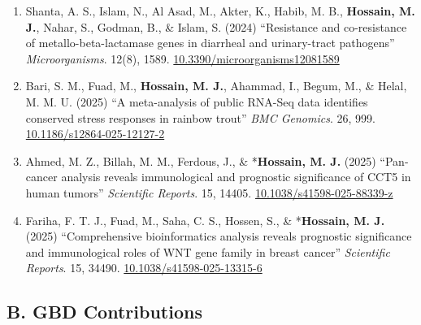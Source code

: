 \documentclass[
  11pt,
  letterpaper,
  DIV=11,
  numbers=noendperiod]{scrartcl}
\begin{document}
\begin{enumerate}
  e70356.
  \href{https://doi.org/10.1002/hsr2.70356}{10.1002/hsr2.70356}\\
\item
  Shanta, A. S., Islam, N., Al Asad, M., Akter, K., Habib, M. B.,
  \textbf{Hossain, M. J.}, Nahar, S., Godman, B., \& Islam, S. (2024)
  ``Resistance and co-resistance of metallo-beta-lactamase genes in
  diarrheal and urinary-tract pathogens'' \emph{Microorganisms}. 12(8),
  1589.
  \href{https://doi.org/10.3390/microorganisms12081589}{10.3390/microorganisms12081589}\\
\item
  Bari, S. M., Fuad, M., \textbf{Hossain, M. J.}, Ahammad, I., Begum,
  M., \& Helal, M. M. U. (2025) ``A meta-analysis of public RNA-Seq data
  identifies conserved stress responses in rainbow trout'' \emph{BMC
  Genomics}. 26, 999.
  \href{https://doi.org/10.1186/s12864-025-12127-2}{10.1186/s12864-025-12127-2}\\
\item
  Ahmed, M. Z., Billah, M. M., Ferdous, J., \& *\textbf{Hossain, M. J.}
  (2025) ``Pan-cancer analysis reveals immunological and prognostic
  significance of CCT5 in human tumors'' \emph{Scientific Reports}. 15,
  14405.
  \href{https://doi.org/10.1038/s41598-025-88339-z}{10.1038/s41598-025-88339-z}\\
\item
  Fariha, F. T. J., Fuad, M., Saha, C. S., Hossen, S., \&
  *\textbf{Hossain, M. J.} (2025) ``Comprehensive bioinformatics
  analysis reveals prognostic significance and immunological roles of
  WNT gene family in breast cancer'' \emph{Scientific Reports}. 15,
  34490.
  \href{https://doi.org/10.1038/s41598-025-13315-6}{10.1038/s41598-025-13315-6}
\end{enumerate}

\subsection{B. GBD Contributions}\label{b.-gbd-contributions}
\end{document}
